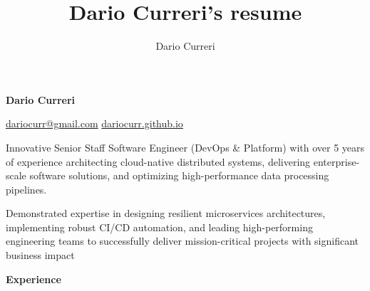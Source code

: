 \documentclass[11pt,letterpaper]{article}
\author{Dario Curreri}
\title{Dario Curreri's resume}
\begin{document}
\makeatletter
\def\Hy@colorlink#1{\begingroup\fontshape{it}\selectfont}%
\makeatother
\begin{justify}
      \begin{LARGE}
            \textbf{Dario Curreri}
      \end{LARGE}
      \hspace{0.5cm}
      \href{mailto:dariocurr@gmail.com}{dariocurr@gmail.com}
      \hspace{0.5cm}
      \href{https://dariocurr.github.io/}{dariocurr.github.io}
      \hfill
      \href{https://github.com/dariocurr/}{\Large{\faGithub}}
      \hspace{0.3cm}
      \href{https://www.linkedin.com/in/dariocurr}{\Large{\faLinkedinIn}}
      \hspace{0.3cm}
      \href{https://scholar.google.it/citations?user=DhJKkeMAAAAJ}{\Large{\faGraduationCap}}

      Innovative Senior Staff Software Engineer (DevOps \& Platform)
      with over 5 years of experience architecting cloud-native distributed systems,
      delivering enterprise-scale software solutions,
      and optimizing high-performance data processing pipelines.

      Demonstrated expertise in designing resilient microservices architectures,
      implementing robust CI/CD automation,
      and leading high-performing engineering teams to successfully deliver mission-critical projects with significant business impact

            {\Large \textbf{Experience} \strut}


\end{justify}
\end{document}
